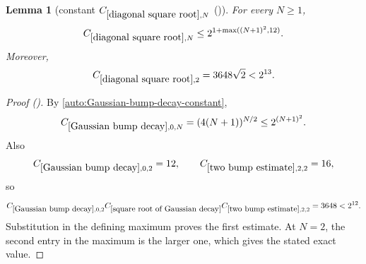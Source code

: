 \documentclass[12pt,reqno]{amsart}
\newcommand{\auto}{{({\tiny\faCar})}}
\theoremstyle{plain}
\newtheorem{lemma}[theorem]{Lemma}
\numberwithin{equation}{section}
\theoremstyle{remark}
\newcommand{\using}[1]{}
\begin{document}
\begin{lemma}[constant $C_{\ref{diagonal square root},N}$ \auto]\label{constant diagonal square root}\using{Gaussian bump decay}\using{two bump estimate}\using{square root of Gaussian decay}
For every $N\ge1$,
\begin{equation}\label{constant diagonal square root bound}
C_{\ref{diagonal square root},N}
\le2^{1+\max((N+1)^2,12)}.
\end{equation}
Moreover,
\begin{equation}\label{auto:constant-diagonal-square-root-two}
C_{\ref{diagonal square root},2}=3648\sqrt2<2^{13}.
\end{equation}
\end{lemma}
\begin{proof}[Proof \auto]
By \eqref{auto:Gaussian-bump-decay-constant},
\[
C_{\ref{Gaussian bump decay},0,N}
=(4(N+1))^{N/2}
\le2^{(N+1)^2}.
\]
Also
\[
C_{\ref{Gaussian bump decay},0,2}=12,
\qquad
C_{\ref{two bump estimate},2,2}=16,
\]
so
\[
C_{\ref{Gaussian bump decay},0,2}
C_{\ref{square root of Gaussian decay}}
C_{\ref{two bump estimate},2,2}
=3648<2^{12}.
\]
Substitution in the defining maximum proves the first estimate. At $N=2$, the second entry in the maximum is the larger one, which gives the stated exact value.
\end{proof}
\end{document}
